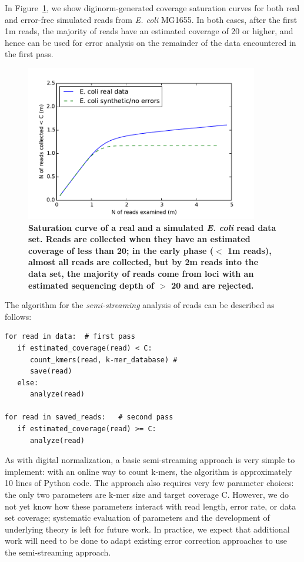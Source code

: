 In Figure~\ref{fig:saturation}, we show diginorm-generated coverage
saturation curves for both real and error-free simulated reads from
{\em E. coli} MG1655.  In both cases, after the first 1m reads, the
majority of reads have an estimated coverage of 20 or higher, and
hence can be used for error analysis on the remainder of the data
encountered in the first pass.

\begin{figure}[!ht]
 \centerline{\includegraphics[width=4in]{./figures/saturation}}
\caption{\bf Saturation curve of a real and a simulated {\em E. coli}
  read data set.  Reads are collected when they have an estimated
  coverage of less than 20; in the early phase ($<$ 1m reads), almost
  all reads are collected, but by 2m reads into the data set, the
  majority of reads come from loci with an estimated sequencing depth
  of $>$ 20 and are rejected.}
\label{fig:saturation}
\end{figure}


The algorithm for the {\em semi-streaming} analysis of reads can be described as
follows:
\begin{verbatim}
for read in data:  # first pass
   if estimated_coverage(read) < C:
      count_kmers(read, k-mer_database) #
      save(read)
   else:
      analyze(read)

for read in saved_reads:   # second pass
   if estimated_coverage(read) >= C:
      analyze(read)
\end{verbatim}


As with digital normalization, a basic semi-streaming approach is very
simple to implement: with an online way to count k-mers, the algorithm
is approximately 10 lines of Python code.  The approach also requires
very few parameter choices: the only two parameters are k-mer size and
target coverage C.  However, we do not yet know how these parameters
interact with read length, error rate, or data set coverage;
systematic evaluation of parameters and the development of underlying
theory is left for future work.  In practice, we expect that
additional work will need to be done to adapt existing error
correction approaches to use the semi-streaming approach.



